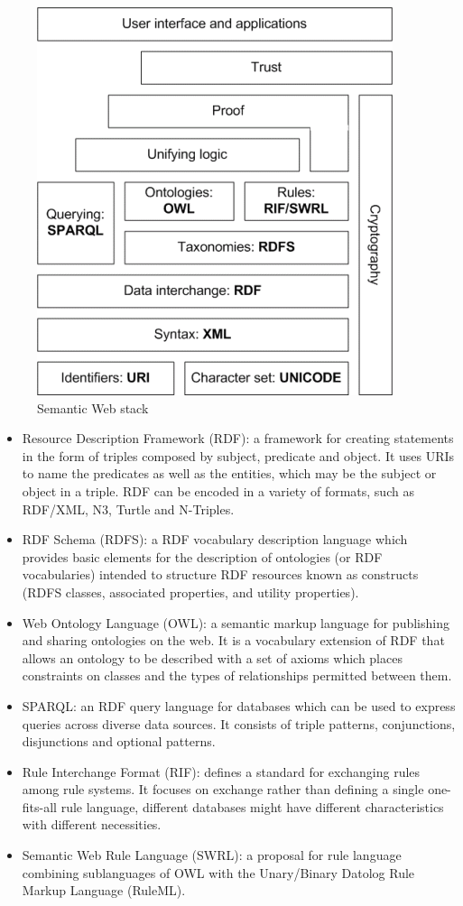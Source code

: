 \begin{figure}
\label{fig:sematicWebLayer}
\begin{center}
  \includegraphics[width=0.5\linewidth]{./Figures/Semantic-web-stack.png}
\end{center}
\caption{Semantic Web stack}
\end{figure}

\begin{itemize}
 \item Resource Description Framework (RDF): a framework for creating statements in the form of triples composed by
subject, predicate and object. It uses URIs to name the predicates as well as the entities, which may be the subject
or
object in a triple. RDF can be encoded in a variety of formats, such as RDF/XML, N3, Turtle and N-Triples.
 \item RDF Schema (RDFS): a RDF vocabulary description language which provides basic elements for the description of
ontologies (or RDF vocabularies) intended to structure RDF resources known as constructs (RDFS classes, associated
properties, and utility properties).
 \item Web Ontology Language (OWL): a semantic markup language for publishing and sharing ontologies on the web. It is
a
vocabulary extension of RDF that allows an ontology to be described with a set of axioms which places constraints on
classes and the types of relationships permitted between them.
 \item SPARQL: an RDF query language for databases which can be used to express queries across diverse data sources.
It
consists of triple patterns, conjunctions, disjunctions and optional patterns. 
 \item Rule Interchange Format (RIF): defines a standard for exchanging rules among rule systems. It focuses on
exchange rather than defining a single one-fits-all rule language, different databases might have different
characteristics with different necessities.
  \item Semantic Web Rule Language (SWRL): a proposal for rule language combining sublanguages of OWL with the
Unary/Binary Datolog Rule Markup Language (RuleML).
\end{itemize}

